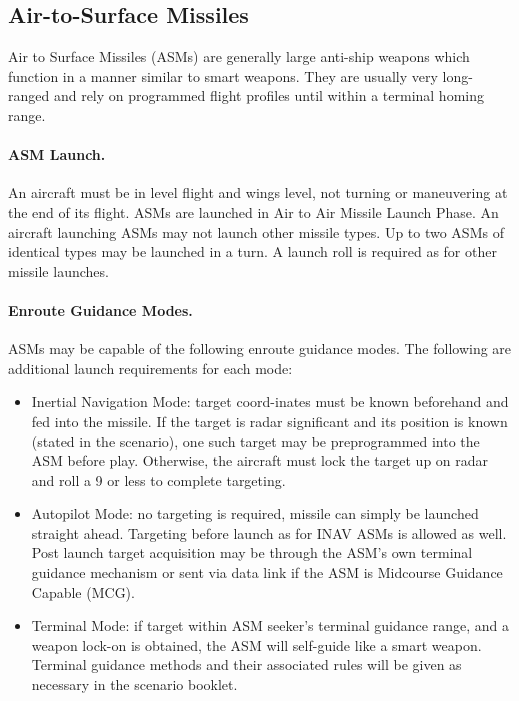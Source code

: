 \begin{advancedrules}

\section{Air-to-Surface Missiles}
\label{rule:asms}

Air to Surface Missiles (ASMs) are generally large anti-ship weapons which function in a manner similar to smart weapons. They are usually very long-ranged and rely on programmed flight profiles until within a terminal homing range.

\paragraph{ASM Launch.} An aircraft must be in level flight and wings level, not turning or maneuvering at the end of its flight. ASMs are launched in Air to Air Missile Launch Phase. An aircraft launching ASMs may not launch other missile types. Up to two ASMs of identical types may be launched in a turn. A launch roll is required as for other missile launches.

\paragraph{Enroute Guidance Modes.} ASMs may be capable of the following enroute guidance modes. The following are additional launch requirements for each mode:

\begin{itemize}
    \item Inertial Navigation Mode: target coord-inates must be known beforehand and fed into the missile. If the target is radar significant and its position is known (stated in the scenario), one such target may be preprogrammed into the ASM before play. Otherwise, the aircraft must lock the target up on radar and roll a 9 or less to complete targeting.

    \item Autopilot Mode: no targeting is required, missile can simply be launched straight ahead. Targeting before launch as for INAV ASMs is allowed as well. Post launch target acquisition may be through the ASM's own terminal guidance mechanism or sent via data link if the ASM is Midcourse Guidance Capable (MCG).

    \item Terminal Mode: if target within ASM seeker's terminal guidance range, and a weapon lock-on is obtained, the ASM will self-guide like a smart weapon. Terminal guidance methods and their associated rules will be given as necessary in the scenario booklet.


\end{itemize}
\end{advancedrules}

